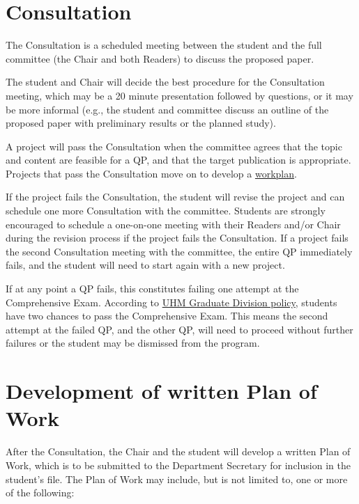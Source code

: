 \documentclass[
]{book}
\begin{document}
\hypertarget{consultation}{%
\section{Consultation}\label{consultation}}

The Consultation is a scheduled meeting between the student and the full committee (the Chair and both Readers) to discuss the proposed paper.

The student and Chair will decide the best procedure for the Consultation meeting, which may be a 20 minute presentation followed by questions, or it may be more informal (e.g., the student and committee discuss an outline of the proposed paper with preliminary results or the planned study).

A project will pass the Consultation when the committee agrees that the topic and content are feasible for a QP, and that the target publication is appropriate. Projects that pass the Consultation move on to develop a \protect\hyperlink{workplan}{workplan}.

If the project fails the Consultation, the student will revise the project and can schedule one more Consultation with the committee. Students are strongly encouraged to schedule a one-on-one meeting with their Readers and/or Chair during the revision process if the project fails the Consultation. If a project fails the second Consultation meeting with the committee, the entire QP immediately fails, and the student will need to start again with a new project.

If at any point a QP fails, this constitutes failing one attempt at the Comprehensive Exam. According to \href{http://www.manoa.hawaii.edu/graduate/content/doctorate}{UHM Graduate Division policy}, students have two chances to pass the Comprehensive Exam. This means the second attempt at the failed QP, and the other QP, will need to proceed without further failures or the student may be dismissed from the program.

\hypertarget{workplan}{%
\section{Development of written Plan of Work}\label{workplan}}

After the Consultation, the Chair and the student will develop a written Plan of Work, which is to be submitted to the Department Secretary for inclusion in the student's file. The Plan of Work may include, but is not limited to, one or more of the following:
\end{document}
